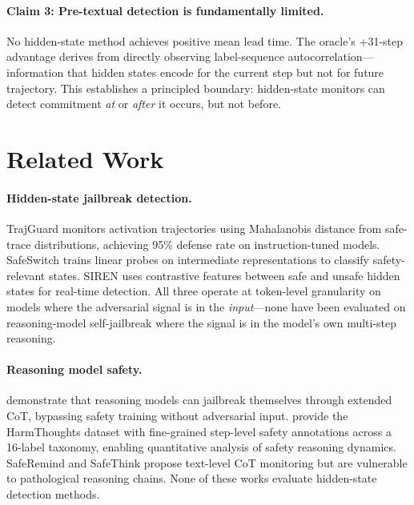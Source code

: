 \documentclass[11pt,a4paper]{article}
\begin{document}
\paragraph{Claim 3: Pre-textual detection is fundamentally limited.} No hidden-state method achieves positive mean lead time. The oracle's +31-step advantage derives from directly observing label-sequence autocorrelation---information that hidden states encode for the current step but not for future trajectory.  This establishes a principled boundary: hidden-state monitors can detect commitment \emph{at} or \emph{after} it occurs, but not before.

\section{Related Work}

\paragraph{Hidden-state jailbreak detection.}
TrajGuard \cite{trajguard} monitors activation trajectories using Mahalanobis distance from safe-trace distributions, achieving 95\% defense rate on instruction-tuned models.
SafeSwitch \cite{safeswitch} trains linear probes on intermediate representations to classify safety-relevant states.
SIREN \cite{siren} uses contrastive features between safe and unsafe hidden states for real-time detection.
All three operate at token-level granularity on models where the adversarial signal is in the \emph{input}---none have been evaluated on reasoning-model self-jailbreak where the signal is in the model's own multi-step reasoning.

\paragraph{Reasoning model safety.}
\citet{selfjailbreaking} demonstrate that reasoning models can jailbreak themselves through extended CoT, bypassing safety training without adversarial input.
\citet{harmthoughts} provide the HarmThoughts dataset with fine-grained step-level safety annotations across a 16-label taxonomy, enabling quantitative analysis of safety reasoning dynamics.
SafeRemind \cite{saferemind} and SafeThink \cite{safethink} propose text-level CoT monitoring but are vulnerable to pathological reasoning chains.
None of these works evaluate hidden-state detection methods.
\end{document}
